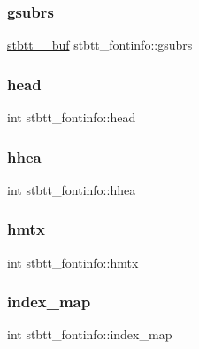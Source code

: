 \subsubsection{\texorpdfstring{gsubrs}{gsubrs}}
{\footnotesize\ttfamily \hyperlink{structstbtt____buf}{stbtt\+\_\+\+\_\+buf} stbtt\+\_\+fontinfo\+::gsubrs}

\hypertarget{structstbtt__fontinfo_ab76ed2f4cbd8fcbd8465ca5f88e7e2b9}{}\label{structstbtt__fontinfo_ab76ed2f4cbd8fcbd8465ca5f88e7e2b9} 
\subsubsection{\texorpdfstring{head}{head}}
{\footnotesize\ttfamily int stbtt\+\_\+fontinfo\+::head}

\hypertarget{structstbtt__fontinfo_a91b82ae03d68892eb7f3fbd3a8b990e5}{}\label{structstbtt__fontinfo_a91b82ae03d68892eb7f3fbd3a8b990e5} 
\subsubsection{\texorpdfstring{hhea}{hhea}}
{\footnotesize\ttfamily int stbtt\+\_\+fontinfo\+::hhea}

\hypertarget{structstbtt__fontinfo_aebf42701e99b88d07a59bf99cb84b9a1}{}\label{structstbtt__fontinfo_aebf42701e99b88d07a59bf99cb84b9a1} 
\subsubsection{\texorpdfstring{hmtx}{hmtx}}
{\footnotesize\ttfamily int stbtt\+\_\+fontinfo\+::hmtx}

\hypertarget{structstbtt__fontinfo_a0b95e3ac0c397b72b7696ce6696eb189}{}\label{structstbtt__fontinfo_a0b95e3ac0c397b72b7696ce6696eb189} 
\subsubsection{\texorpdfstring{index\+\_\+map}{index\_map}}
{\footnotesize\ttfamily int stbtt\+\_\+fontinfo\+::index\+\_\+map}

